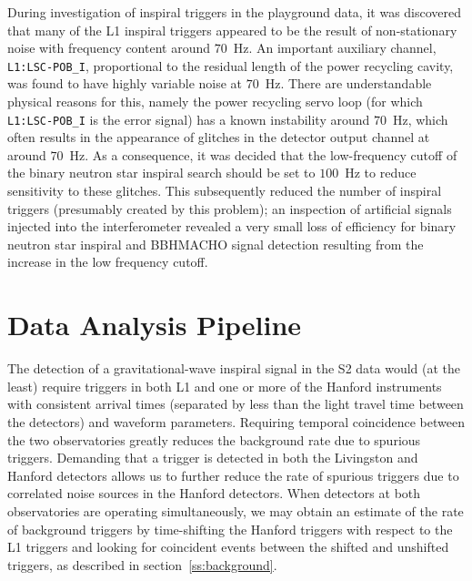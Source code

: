 During investigation of inspiral triggers in the playground data, it was
discovered that many of the L1 inspiral triggers appeared to be the result of
non-stationary noise with frequency content around $70$~Hz.  An important
auxiliary channel, \texttt{L1:LSC-POB\_I}, proportional to the residual length
of the power recycling cavity, was found to have highly variable noise at
$70$~Hz.  There are understandable physical reasons for this, namely the power
recycling servo loop (for which \texttt{L1:LSC-POB\_I} is the error signal)
has a known instability around $70$~Hz, which often results in the appearance
of glitches in the detector output channel at around $70$~Hz.  As a
consequence, it was decided that the low-frequency cutoff of the binary
neutron star inspiral search should be set to $100$~Hz to reduce sensitivity
to these glitches.  This subsequently reduced the number of inspiral triggers
(presumably created by this problem); an inspection of artificial signals
injected into the interferometer revealed a very small loss of efficiency for
binary neutron star inspiral and BBHMACHO signal detection resulting from the
increase in the low frequency cutoff.

\section{Data Analysis Pipeline}
\label{s:pipeline}

The detection of a gravitational-wave inspiral signal in the S2 data would
(at the least) require triggers in both L1 and one or more of the Hanford
instruments with consistent arrival times (separated by less than the light
travel time between the detectors) and waveform parameters.  Requiring
temporal coincidence between the two observatories greatly reduces the
background rate due to spurious triggers. Demanding that a trigger is
detected in both the Livingston and Hanford detectors allows us to further
reduce the rate of spurious triggers due to correlated noise sources in the
Hanford detectors. When detectors at both observatories are operating
simultaneously, we may obtain an estimate of the rate of background triggers
by time-shifting the Hanford triggers with respect to the L1 triggers and
looking for coincident events between the shifted and unshifted triggers, as
described in section~\ref{ss:background}. 

